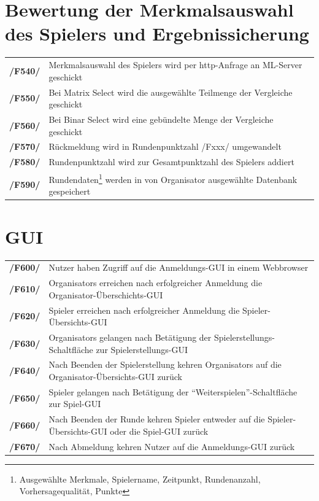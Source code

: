 \documentclass[a4paper]{scrreprt}
\begin{document}
    \section{Bewertung der Merkmalsauswahl des Spielers und Ergebnissicherung}
    \begin{tabularx}{\linewidth}{@{}>{\bfseries}l@{\hspace{.5em}}X@{}} %
    /F540/ & Merkmalsauswahl des \Gls{Spieler}s wird per http-Anfrage an ML-Server geschickt \\
    /F550/ & Bei \Gls{Matrix Select} wird die ausgewählte Teilmenge der Vergleiche geschickt \\
    /F560/ & Bei \Gls{Binar Select} wird eine gebündelte Menge der Vergleiche geschickt \\
    /F570/ & Rückmeldung wird in Rundenpunktzahl /Fxxx/ umgewandelt \\ %
    /F580/ & Rundenpunktzahl wird zur Gesamtpunktzahl des \Gls{Spieler}s addiert \\
    /F590/ & Rundendaten\footnote{Ausgewählte Merkmale, Spielername, Zeitpunkt, Rundenanzahl, Vorhersagequalität, Punkte} werden in von Organisator ausgewählte Datenbank gespeichert \\ %
    \end{tabularx}
    
    \section{GUI}
    \begin{tabularx}{\linewidth}{@{}>{\bfseries}l@{\hspace{.5em}}X@{}} %
    /F600/ & Nutzer haben Zugriff auf die Anmeldungs-GUI in einem Webbrowser \\
    /F610/ & \Glspl{Organisator} erreichen nach erfolgreicher Anmeldung die Organisator-Überschichts-GUI \\
    /F620/ & \Gls{Spieler} erreichen nach erfolgreicher Anmeldung die Spieler-Übersichts-GUI \\
    /F630/ & \Glspl{Organisator} gelangen nach Betätigung der Spielerstellungs-Schaltfläche zur Spielerstellungs-GUI \\
    /F640/ & Nach Beenden der Spielerstellung kehren \Glspl{Organisator} auf die Organisator-Übersichts-GUI zurück \\
    /F650/ & \Gls{Spieler} gelangen nach Betätigung der \enquote{Weiterspielen}-Schaltfläche zur Spiel-GUI \\
    /F660/ & Nach Beenden der Runde kehren \Gls{Spieler} entweder auf die Spieler-Übersichts-GUI oder die Spiel-GUI zurück \\
    /F670/ & Nach Abmeldung kehren Nutzer auf die Anmeldungs-GUI zurück \\
    \end{tabularx}
        
\end{document}
